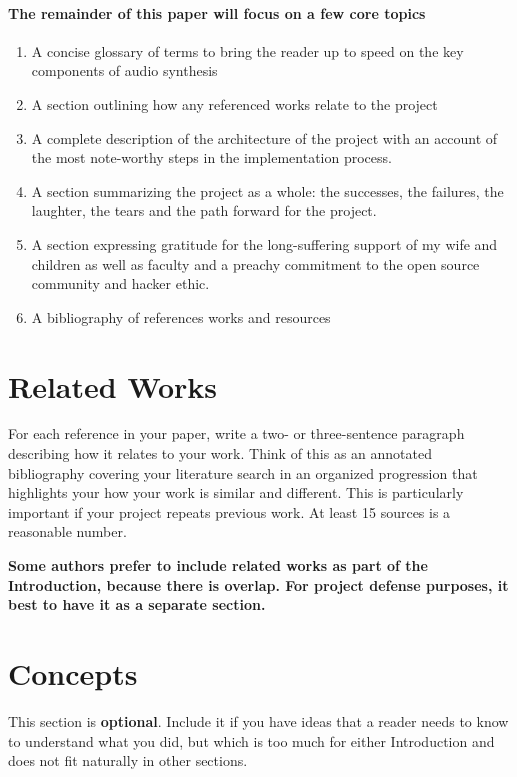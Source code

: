 \documentclass[acmlarge,screen]{acmart}
\begin{document}
	\paragraph{The remainder of this paper will focus on a few core topics}
	\begin{enumerate}
		\item A concise glossary of terms to bring the reader up to speed on the key components of audio synthesis
		\item A section outlining how any referenced works relate to the project
		\item A complete description of the architecture of the project with an account of the most note-worthy steps in the implementation process. 
		\item A section summarizing the project as a whole: the successes, the failures, the laughter, the tears and the path forward for the project.
		\item A section expressing gratitude for the long-suffering support of my wife and children as well as faculty and a preachy commitment to the open source community and hacker ethic.
		\item A bibliography of references works and resources
	\end{enumerate}

\section{Related Works}
For each reference in your paper, write a two- or three-sentence paragraph 
describing how it relates to your work. Think of this as an annotated bibliography
covering your literature search in an organized progression that highlights your 
how your work is similar and different. This is particularly important if your project repeats
previous work. At least 15 sources is a reasonable number.

\textbf{Some authors prefer to include related works as part of the Introduction, because there
is overlap. For project defense purposes, it best to have it as a separate section.}

\section{Concepts}
This section is \textbf{optional}. Include it if you have ideas that a reader needs to know to
understand what you did, but which is too much for either Introduction and does not
fit naturally in other sections.
\end{document}

